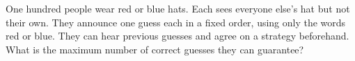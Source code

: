 One hundred people wear red or blue hats. Each sees everyone else's hat but not their own. They announce one guess each in a fixed order, using only the words red or blue. They can hear previous guesses and agree on a strategy beforehand. What is the maximum number of correct guesses they can guarantee?
